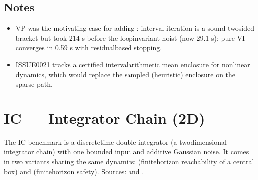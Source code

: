 \documentclass[a4paper,10pt,english]{sphinxmanual}
\begin{document}
\subsection{Notes}
\label{\detokenize{benchmarks/VP:notes}}\begin{itemize}
\item {} 
\sphinxAtStartPar
VP was the motivating case for adding : interval
iteration is a sound two\sphinxhyphen{}sided bracket but took 214 s before the loop\sphinxhyphen{}invariant
hoist (now 29.1 s); pure VI converges in 0.59 s with residual\sphinxhyphen{}based stopping.

\item {} 
\sphinxAtStartPar
ISSUE\sphinxhyphen{}0021 tracks a certified interval\sphinxhyphen{}arithmetic mean enclosure for nonlinear
dynamics, which would replace the sampled (heuristic) enclosure on the sparse path.

\end{itemize}

\sphinxstepscope


\section{IC — Integrator Chain (2D)}
\label{\detokenize{benchmarks/IC:ic-integrator-chain-2d}}\label{\detokenize{benchmarks/IC::doc}}
\sphinxAtStartPar
The IC benchmark is a discrete\sphinxhyphen{}time double integrator (a two\sphinxhyphen{}dimensional integrator
chain) with one bounded input and additive Gaussian noise. It comes in two variants
sharing the same dynamics:  (finite\sphinxhyphen{}horizon reachability of a central box)
and  (finite\sphinxhyphen{}horizon safety). Sources:
 and .
\end{document}
